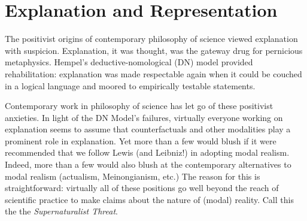 \documentclass{article}
\date{}
\begin{document}
\setlength{\parindent}{1cm}
\large
\doublespacing
%

\section{Explanation and Representation}

The positivist origins of contemporary philosophy of science viewed explanation with suspicion. Explanation, it was thought, was the gateway drug for pernicious metaphysics. Hempel's deductive-nomological (DN) model provided rehabilitation: explanation was made respectable again when it could be couched in a logical language and moored to empirically testable statements.

Contemporary work in philosophy of science has let go of these positivist anxieties. In light of the DN Model's failures, virtually everyone working on explanation seems to assume that counterfactuals and other modalities play a prominent role in explanation. Yet more than a few would blush if it were recommended that we follow Lewis (and Leibniz!) in adopting modal realism. Indeed, more than a few would also blush at the contemporary alternatives to modal realism (actualism, Meinongianism, etc.) The reason for this is straightforward: virtually all of these positions go well beyond the reach of scientific practice to make claims about the nature of (modal) reality. Call this the the \textit{Supernaturalist Threat}.
\end{document}
